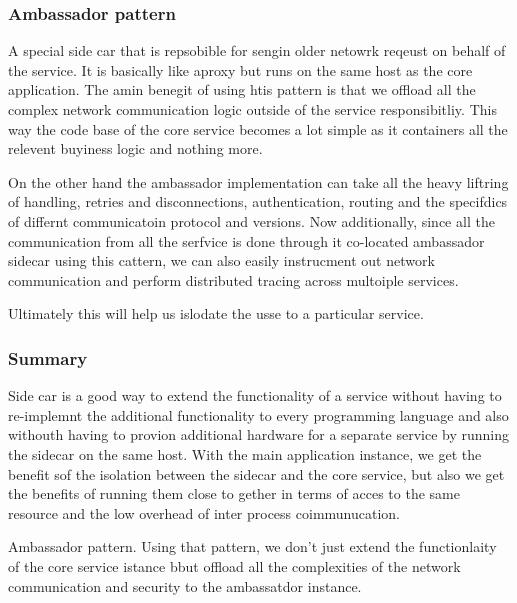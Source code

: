 \documentclass[a4paper, 11pt]{book}
\begin{document}
{    \subsubsection{Ambassador pattern}
    A special side car that is repsobible for sengin older netowrk reqeust on behalf of the service.
    It is basically like aproxy but runs on the same host as the core application.
    The amin benegit of using htis pattern is that we offload all the complex network communication logic outside of the service responsibitliy.
    This way the code base of the core service becomes a lot simple as it containers all the relevent buyiness logic and nothing more.

    On the other hand the ambassador implementation can take all the heavy liftring of handling, retries and disconnections, authentication, routing and the specifdics of differnt communicatoin protocol and versions.
    Now additionally, since all the communication from all the serfvice is done through it co-located ambassador sidecar using this cattern, we can also easily instrucment out network communication and perform distributed tracing across multoiple services.

    Ultimately this will help us islodate the usse to a particular service.

    \subsubsection{Summary}
    Side car is a good way to extend the functionality of a service without having to re-implemnt the additional functionality to every programming language and also withouth having to provion additional hardware for a separate service by running the sidecar on the same host.
    With the main application instance, we get the benefit sof the isolation between the sidecar and the core service, but also we get the benefits of running them close to gether in terms of acces to the same resource and the low overhead of inter process coimmunucation.

    Ambassador pattern.
    Using that pattern, we don't just extend the functionlaity of the core service istance bbut offload all the complexities of the network communication and security to the ambassatdor instance.

}
\end{document}
